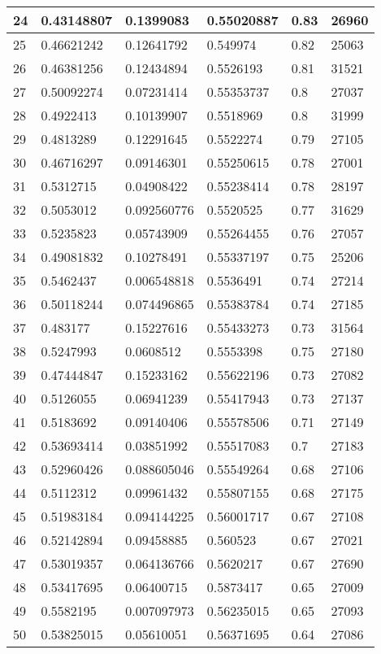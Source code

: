 \begin{longtable}{|l|l|l|l|l|l|}
24 & 0.43148807 & 0.1399083 & 0.55020887 & 0.83 & 26960 \\ \hline 
25 & 0.46621242 & 0.12641792 & 0.549974 & 0.82 & 25063 \\ \hline 
26 & 0.46381256 & 0.12434894 & 0.5526193 & 0.81 & 31521 \\ \hline 
27 & 0.50092274 & 0.07231414 & 0.55353737 & 0.8 & 27037 \\ \hline 
28 & 0.4922413 & 0.10139907 & 0.5518969 & 0.8 & 31999 \\ \hline 
29 & 0.4813289 & 0.12291645 & 0.5522274 & 0.79 & 27105 \\ \hline 
30 & 0.46716297 & 0.09146301 & 0.55250615 & 0.78 & 27001 \\ \hline 
31 & 0.5312715 & 0.04908422 & 0.55238414 & 0.78 & 28197 \\ \hline 
32 & 0.5053012 & 0.092560776 & 0.5520525 & 0.77 & 31629 \\ \hline 
33 & 0.5235823 & 0.05743909 & 0.55264455 & 0.76 & 27057 \\ \hline 
34 & 0.49081832 & 0.10278491 & 0.55337197 & 0.75 & 25206 \\ \hline 
35 & 0.5462437 & 0.006548818 & 0.5536491 & 0.74 & 27214 \\ \hline 
36 & 0.50118244 & 0.074496865 & 0.55383784 & 0.74 & 27185 \\ \hline 
37 & 0.483177 & 0.15227616 & 0.55433273 & 0.73 & 31564 \\ \hline 
38 & 0.5247993 & 0.0608512 & 0.5553398 & 0.75 & 27180 \\ \hline 
39 & 0.47444847 & 0.15233162 & 0.55622196 & 0.73 & 27082 \\ \hline 
40 & 0.5126055 & 0.06941239 & 0.55417943 & 0.73 & 27137 \\ \hline 
41 & 0.5183692 & 0.09140406 & 0.55578506 & 0.71 & 27149 \\ \hline 
42 & 0.53693414 & 0.03851992 & 0.55517083 & 0.7 & 27183 \\ \hline 
43 & 0.52960426 & 0.088605046 & 0.55549264 & 0.68 & 27106 \\ \hline 
44 & 0.5112312 & 0.09961432 & 0.55807155 & 0.68 & 27175 \\ \hline 
45 & 0.51983184 & 0.094144225 & 0.56001717 & 0.67 & 27108 \\ \hline 
46 & 0.52142894 & 0.09458885 & 0.560523 & 0.67 & 27021 \\ \hline 
47 & 0.53019357 & 0.064136766 & 0.5620217 & 0.67 & 27690 \\ \hline 
48 & 0.53417695 & 0.06400715 & 0.5873417 & 0.65 & 27009 \\ \hline 
49 & 0.5582195 & 0.007097973 & 0.56235015 & 0.65 & 27093 \\ \hline 
50 & 0.53825015 & 0.05610051 & 0.56371695 & 0.64 & 27086 \\ \hline 
\end{longtable}